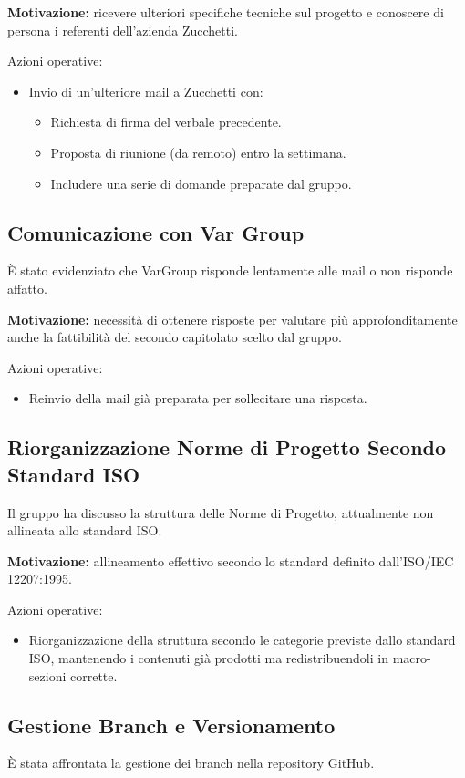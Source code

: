 \textbf{Motivazione:} ricevere ulteriori specifiche tecniche sul progetto e conoscere di persona i referenti dell'azienda Zucchetti.

Azioni operative:
\begin{itemize}
	\item Invio di un'ulteriore mail a Zucchetti con:
	\begin{itemize}
		\item Richiesta di firma del verbale precedente.
		\item Proposta di riunione (da remoto) entro la settimana.
		\item Includere una serie di domande preparate dal gruppo.
	\end{itemize}
\end{itemize}

\subsection{Comunicazione con Var Group}
È stato evidenziato che VarGroup risponde lentamente alle mail o non risponde affatto.

\textbf{Motivazione:} necessità di ottenere risposte per valutare più approfonditamente anche la fattibilità del secondo capitolato scelto dal gruppo.

Azioni operative:
\begin{itemize}
	\item Reinvio della mail già preparata per sollecitare una risposta.
\end{itemize}


\subsection{Riorganizzazione Norme di Progetto Secondo Standard ISO}
Il gruppo ha discusso la struttura delle Norme di Progetto, attualmente non allineata allo standard ISO.

\textbf{Motivazione:} allineamento effettivo secondo lo standard definito dall'ISO/IEC 12207:1995.

Azioni operative:
\begin{itemize}
	\item Riorganizzazione della struttura secondo le categorie previste dallo standard ISO, mantenendo i contenuti già prodotti ma redistribuendoli in macro-sezioni corrette.
\end{itemize}

\subsection{Gestione Branch e Versionamento}
È stata affrontata la gestione dei branch nella repository GitHub.


